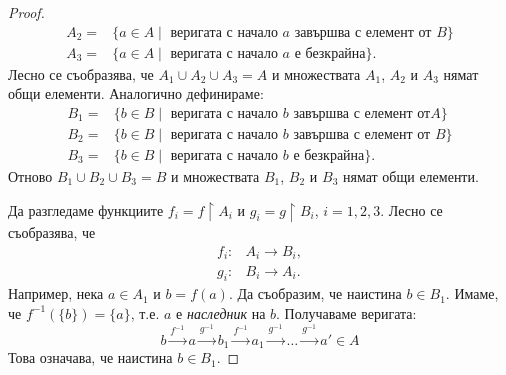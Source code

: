 \begin{proof}
\begin{align*}
  A_2 = & \{a\in A \mid \mbox{ веригата с начало $a$ завършва с елемент от } B\}\\
  A_3 = & \{a\in A \mid \mbox{ веригата с начало $a$ е безкрайна} \}.
\end{align*}
Лесно се съобразява, че $A_1\cup A_2\cup A_3 = A$ и 
множествата $A_1$, $A_2$ и $A_3$ нямат общи елементи.
Аналогично дефинираме:
\begin{align*}
  B_1 = & \{b\in B \mid \mbox{ веригата с начало $b$ завършва с елемент от} A\}\\
  B_2 = & \{b\in B \mid \mbox{ веригата с начало $b$ завършва с елемент от } B\}\\
  B_3 = & \{b\in B \mid \mbox{ веригата с начало $b$ е безкрайна} \}.
\end{align*}
Отново $B_1\cup B_2\cup B_3 = B$ и множествата $B_1$, $B_2$ и $B_3$ нямат общи елементи.

Да разгледаме функциите $f_i = f\upharpoonright{A_i}$ и $g_i = g\upharpoonright{B_i}$, $i = 1,2,3$. 
Лесно се съобразява, че 
\begin{align*}
  f_i:& A_i\to B_i,\\
  g_i:& B_i\to A_i.
\end{align*}
Например, нека $a \in A_1$ и $b = f(a)$. Да съобразим, че наистина $b \in B_1$.
Имаме, че $f^{-1}(\{b\}) = \{a\}$, т.е. $a$ е {\em наследник} на $b$.
Получаваме веригата:
\[b \stackrel{f^{-1}}{\longrightarrow}a \stackrel{g^{-1}}{\longrightarrow} b_1 \stackrel{f^{-1}}{\longrightarrow} a_1 \stackrel{g^{-1}}{\longrightarrow}\dots \stackrel{g^{-1}}{\longrightarrow}a' \in A\]
Това означава, че наистина $b \in B_1$.


\end{proof}
